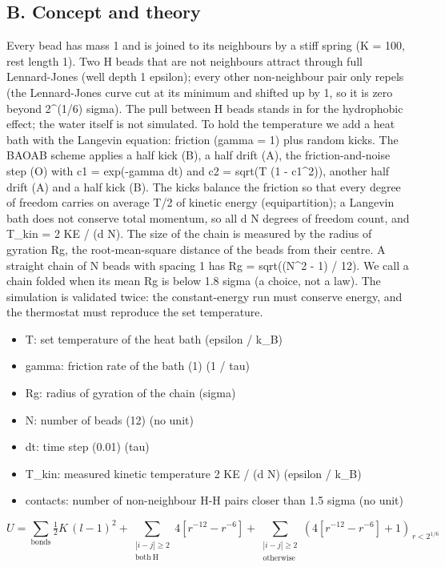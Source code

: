 \documentclass[11pt,a4paper]{article}
\begin{document}
\subsection*{B. Concept and theory}
Every bead has mass 1 and is joined to its neighbours by a stiff spring (K = 100, rest length 1). Two H beads that are not neighbours attract through full Lennard-Jones (well depth 1 epsilon); every other non-neighbour pair only repels (the Lennard-Jones curve cut at its minimum and shifted up by 1, so it is zero beyond 2\textasciicircum{}(1/6) sigma). The pull between H beads stands in for the hydrophobic effect; the water itself is not simulated. To hold the temperature we add a heat bath with the Langevin equation: friction (gamma = 1) plus random kicks. The BAOAB scheme applies a half kick (B), a half drift (A), the friction-and-noise step (O) with c1 = exp(-gamma dt) and c2 = sqrt(T (1 - c1\textasciicircum{}2)), another half drift (A) and a half kick (B). The kicks balance the friction so that every degree of freedom carries on average T/2 of kinetic energy (equipartition); a Langevin bath does not conserve total momentum, so all d N degrees of freedom count, and T\_kin = 2 KE / (d N). The size of the chain is measured by the radius of gyration Rg, the root-mean-square distance of the beads from their centre. A straight chain of N beads with spacing 1 has Rg = sqrt((N\textasciicircum{}2 - 1) / 12). We call a chain folded when its mean Rg is below 1.8 sigma (a choice, not a law). The simulation is validated twice: the constant-energy run must conserve energy, and the thermostat must reproduce the set temperature.

\begin{itemize}[nosep]
\item T: set temperature of the heat bath (epsilon / k\_B)
\item gamma: friction rate of the bath (1) (1 / tau)
\item Rg: radius of gyration of the chain (sigma)
\item N: number of beads (12) (no unit)
\item dt: time step (0.01) (tau)
\item T\_kin: measured kinetic temperature 2 KE / (d N) (epsilon / k\_B)
\item contacts: number of non-neighbour H-H pairs closer than 1.5 sigma (no unit)
\end{itemize}

\begin{equation*}
U=\sum_{\mathrm{bonds}}\tfrac12 K\,(l-1)^2+\sum_{\substack{|i-j|\ge 2\\ \mathrm{both\ H}}}4\!\left[r^{-12}-r^{-6}\right]+\sum_{\substack{|i-j|\ge 2\\ \mathrm{otherwise}}}\left(4\!\left[r^{-12}-r^{-6}\right]+1\right)_{\,r<2^{1/6}}
\end{equation*}
\end{document}
